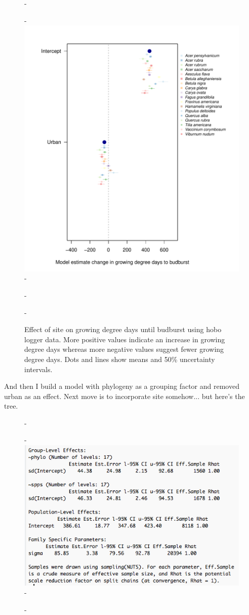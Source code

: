 \documentclass{article}\usepackage[]{graphicx}\usepackage[]{color}
\begin{document}
{\begin{figure} [H]
  -\begin{center}
  -\includegraphics[width=12cm]{..//analyses/figures/muplothobo_urb.pdf}
  -\caption{Effect of site on growing degree days until budburst using hobo logger data. More positive values indicate an increase in growing degree days whereas more negative values suggest fewer growing degree days. Dots and lines show means and 50\% uncertainty intervals.}
  -\end{center}
  -\end{figure}}
  
And then I build a model with phylogeny as a grouping factor and removed urban as an effect. Next move is to incorporate site somehow... but here's the tree. 

{\begin{figure} [H]
  -\begin{center}
  -\includegraphics[width=12cm]{..//analyses/figures/phylooutput}
  -\end{center}
  -\end{figure}}
\end{document}

